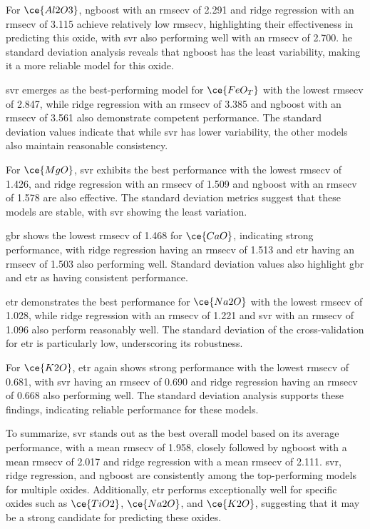 For $\ce{Al2O3}$, \gls{ngboost} with an \gls{rmsecv} of 2.291 and ridge regression with an \gls{rmsecv} of 3.115 achieve relatively low \gls{rmsecv}, highlighting their effectiveness in predicting this oxide, with \gls{svr} also performing well with an \gls{rmsecv} of 2.700.
he standard deviation analysis reveals that \gls{ngboost} has the least variability, making it a more reliable model for this oxide.

\gls{svr} emerges as the best-performing model for $\ce{FeO_T}$ with the lowest \gls{rmsecv} of 2.847, while ridge regression with an \gls{rmsecv} of 3.385 and \gls{ngboost} with an \gls{rmsecv} of 3.561 also demonstrate competent performance.
The standard deviation values indicate that while \gls{svr} has lower variability, the other models also maintain reasonable consistency.

For $\ce{MgO}$, \gls{svr} exhibits the best performance with the lowest \gls{rmsecv} of 1.426, and ridge regression with an \gls{rmsecv} of 1.509 and \gls{ngboost} with an \gls{rmsecv} of 1.578 are also effective.
The standard deviation metrics suggest that these models are stable, with \gls{svr} showing the least variation.

\gls{gbr} shows the lowest \gls{rmsecv} of 1.468 for $\ce{CaO}$, indicating strong performance, with ridge regression having an \gls{rmsecv} of 1.513 and \gls{etr} having an \gls{rmsecv} of 1.503 also performing well.
Standard deviation values also highlight \gls{gbr} and \gls{etr} as having consistent performance.

\gls{etr} demonstrates the best performance for $\ce{Na2O}$ with the lowest \gls{rmsecv} of 1.028, while ridge regression with an \gls{rmsecv} of 1.221 and \gls{svr} with an \gls{rmsecv} of 1.096 also perform reasonably well.
The standard deviation of the cross-validation for \gls{etr} is particularly low, underscoring its robustness.

For $\ce{K2O}$, \gls{etr} again shows strong performance with the lowest \gls{rmsecv} of 0.681, with \gls{svr} having an \gls{rmsecv} of 0.690 and ridge regression having an \gls{rmsecv} of 0.668 also performing well.
The standard deviation analysis supports these findings, indicating reliable performance for these models.

To summarize, \gls{svr} stands out as the best overall model based on its average performance, with a mean \gls{rmsecv} of 1.958, closely followed by \gls{ngboost} with a mean \gls{rmsecv} of 2.017 and ridge regression with a mean \gls{rmsecv} of 2.111. \gls{svr}, ridge regression, and \gls{ngboost} are consistently among the top-performing models for multiple oxides.
Additionally, \gls{etr} performs exceptionally well for specific oxides such as $\ce{TiO2}$, $\ce{Na2O}$, and $\ce{K2O}$, suggesting that it may be a strong candidate for predicting these oxides.

